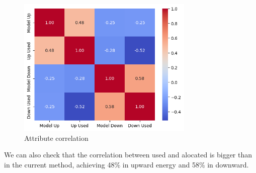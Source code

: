 \begin{figure}[H]
    \centering
    \includegraphics[width=0.75\textwidth]{plots/heatmap_correlation_pred.png}
    \caption{Attribute correlation}
    \label{fig:Attribute_correlation}
  \end{figure}


We can also check that the correlation between used and alocated is bigger than in the current method, achieving 48\% in upward energy and 58\% in downward. \par




